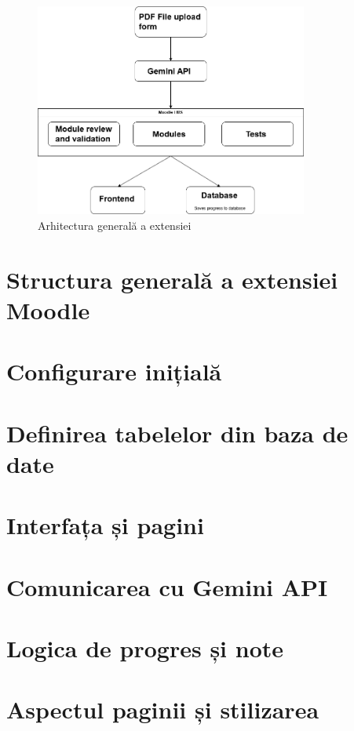 \begin{figure}[ht]
    \centering
    \includegraphics[width=0.8\textwidth]{images/LicentaArchitectureDiagram.png}
    \caption{Arhitectura generală a extensiei}
    \label{fig:arch_diagram}
\end{figure}

\section{Structura generală a extensiei Moodle}

\section{Configurare inițială}

\section{Definirea tabelelor din baza de date}

\section{Interfața și pagini}

\section{Comunicarea cu Gemini API}

\section{Logica de progres și note}

\section{Aspectul paginii și stilizarea}
